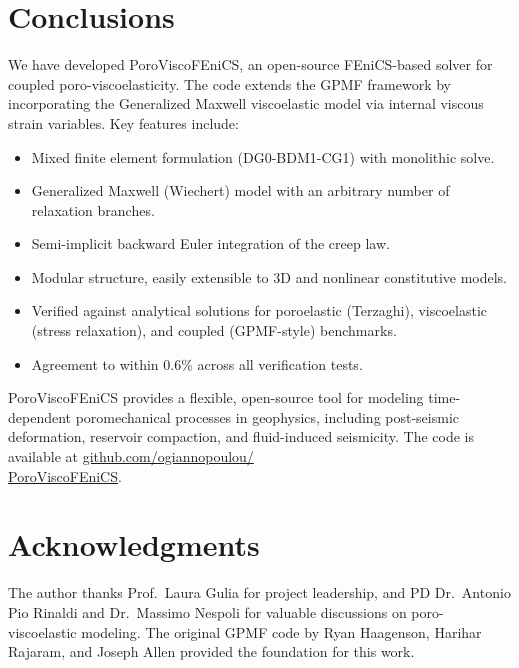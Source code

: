 \documentclass[a4paper,fleqn,longmktitle]{cas-sc}
\begin{document}
\section{Conclusions}
\label{sec:conclusions}

We have developed PoroViscoFEniCS, an open-source FEniCS-based solver for
coupled poro-viscoelasticity. The code extends the GPMF framework by
incorporating the Generalized Maxwell viscoelastic model via internal viscous
strain variables. Key features include:

\begin{itemize}
  \item Mixed finite element formulation (DG0-BDM1-CG1) with monolithic solve.
  \item Generalized Maxwell (Wiechert) model with an arbitrary number of
        relaxation branches.
  \item Semi-implicit backward Euler integration of the creep law.
  \item Modular structure, easily extensible to 3D and nonlinear constitutive
        models.
  \item Verified against analytical solutions for poroelastic (Terzaghi),
        viscoelastic (stress relaxation), and coupled (GPMF-style) benchmarks.
  \item Agreement to within $0.6\%$ across all verification tests.
\end{itemize}

PoroViscoFEniCS provides a flexible, open-source tool for modeling
time-dependent poromechanical processes in geophysics, including post-seismic
deformation, reservoir compaction, and fluid-induced seismicity. The code
is available at
\href{https://github.com/ogiannopoulou/PoroViscoFEniCS}{github.com/ogiannopoulou/\\
PoroViscoFEniCS}.

\section*{Acknowledgments}

The author thanks Prof.\ Laura Gulia for project leadership, and PD Dr.\ Antonio
Pio Rinaldi and Dr.\ Massimo Nespoli for valuable discussions on
poro-viscoelastic modeling. The original GPMF code by Ryan Haagenson, Harihar Rajaram, and
Joseph Allen provided the foundation for this work.



\end{document}
